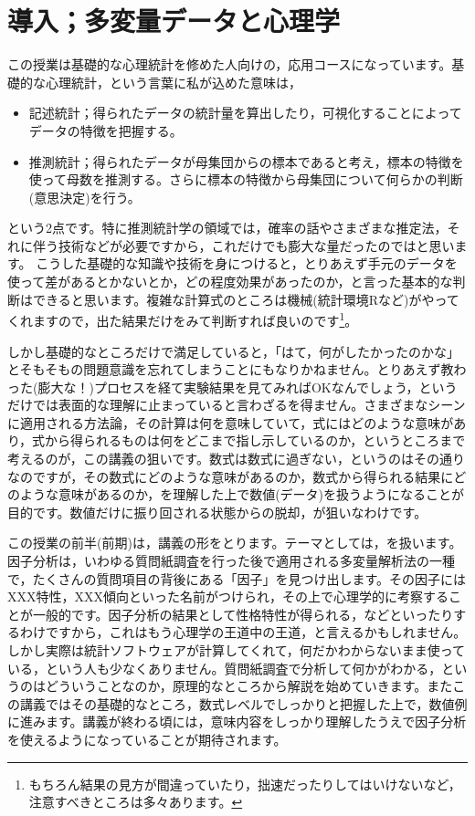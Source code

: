 \documentclass{ltjsbook}
\begin{document}
 
\chapter{導入；多変量データと心理学} 
\label{chapter1} 

この授業は基礎的な心理統計を修めた人向けの，応用コースになっています。基礎的な心理統計，という言葉に私が込めた意味は，
\begin{itemize}
    \item 記述統計；得られたデータの統計量を算出したり，可視化することによってデータの特徴を把握する。
    \item 推測統計；得られたデータが母集団からの標本であると考え，標本の特徴を使って母数を推測する。さらに標本の特徴から母集団について何らかの判断(意思決定)を行う。
\end{itemize}
という2点です。特に推測統計学の領域では，確率の話やさまざまな推定法，それに伴う技術などが必要ですから，これだけでも膨大な量だったのではと思います。
こうした基礎的な知識や技術を身につけると，とりあえず手元のデータを使って差があるとかないとか，どの程度効果があったのか，と言った基本的な判断はできると思います。複雑な計算式のところは機械(統計環境Rなど)がやってくれますので，出た結果だけをみて判断すれば良いのです\footnote{もちろん結果の見方が間違っていたり，拙速だったりしてはいけないなど，注意すべきところは多々あります。}。

しかし基礎的なところだけで満足していると，「はて，何がしたかったのかな」とそもそもの問題意識を忘れてしまうことにもなりかねません。とりあえず教わった(膨大な！)プロセスを経て実験結果を見てみればOKなんでしょう，というだけでは表面的な理解に止まっていると言わざるを得ません。さまざまなシーンに適用される方法論，その計算は何を意味していて，式にはどのような意味があり，式から得られるものは何をどこまで指し示しているのか，というところまで考えるのが，この講義の狙いです。数式は数式に過ぎない，というのはその通りなのですが，その数式にどのような意味があるのか，数式から得られる結果にどのような意味があるのか，を理解した上で数値(データ)を扱うようになることが目的です。数値だけに振り回される状態からの脱却，が狙いなわけです。

この授業の前半(前期)は，講義の形をとります。テーマとしては，を扱います。因子分析は，いわゆる質問紙調査を行った後で適用される多変量解析法の一種で，たくさんの質問項目の背後にある「因子」を見つけ出します。その因子にはXXX特性，XXX傾向といった名前がつけられ，その上で心理学的に考察することが一般的です。因子分析の結果として性格特性が得られる，などといったりするわけですから，これはもう心理学の王道中の王道，と言えるかもしれません。しかし実際は統計ソフトウェアが計算してくれて，何だかわからないまま使っている，という人も少なくありません。質問紙調査で分析して何かがわかる，というのはどういうことなのか，原理的なところから解説を始めていきます。またこの講義ではその基礎的なところ，数式レベルでしっかりと把握した上で，数値例に進みます。講義が終わる頃には，意味内容をしっかり理解したうえで因子分析を使えるようになっていることが期待されます。
\end{document}
